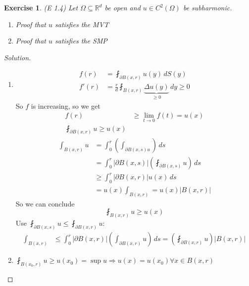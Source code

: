 \documentclass{report}
\theoremstyle{tommy}
\newtheorem{ex}[defn]{Exercise}
\begin{document}
\begin{ex} (E 1.4)
  Let \(\Omega \subseteq \mathbb{R}^d\) be open and \(u \in C^2(\Omega)\) be subharmonic.
  \begin{enumerate}
    \item Proof that \(u\) satisfies the MVT
    \item Proof that \(u\) satisfies the SMP
  \end{enumerate}
\end{ex}

\begin{proof}[Solution]
  \begin{enumerate}
    \item 
      \begin{align*}
        f(r) &= \fint_{\partial B(x, r)} u(y) \, dS(y) \\
        f'(r) &= \frac{r}{d} \fint_{B(x, r)} \underbrace{\Delta u(y)}_{\ge 0} \, dy \ge 0
      \end{align*}
      So \(f\) is increasing, so we get
      \begin{align*}
        f(r) &\ge \lim_{t \to 0} f(t) = u(x) \\
        \fint_{\partial B(x, r)} u \ge u(x)
      \end{align*}
      \begin{align*}
        \int_{B(x,r)} u 
        &= \int_0^r \left(\int_{\partial B(x,s) u}\right) \, ds \\
        &= \int_0^r |\partial B(x, s)| \left(\fint_{\partial B(x, s)} u\right) \, ds \\
        &\ge \int_0^r |\partial B(x,r)| u(x) \, ds \\
        &= u(x) \int_{B(x,r)} = u(x) |B(x,r)|
      \end{align*}
      So we can conclude
      \[\fint_{B(x,r)} u \ge u(x)\]
      Use \(\fint_{\partial B(x,s)} u \le \fint_{\partial B(x,r)} u\):
      \begin{align*}
        \int_{B(x,r)} 
        &\le \int_0^r |\partial B(x,r)| \left(\int_{\partial B(x,r)} u\right) \, ds = \left( \fint_{\partial B(x,r)} u \right) |B(x,r)|
      \end{align*}
    \item \(\fint_{B(x_0, r)} u \ge u(x_0) = \sup u \Rightarrow u(x) = u(x_0) \forall x \in B(x,r)\)
  \end{enumerate}
\end{proof}
\end{document}
